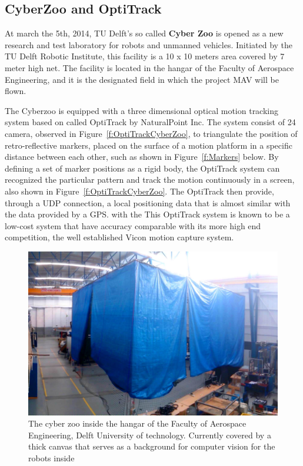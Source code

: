 \subsection{CyberZoo and OptiTrack}
At march the 5th, 2014, TU Delft's so called \textbf{Cyber Zoo} is opened as a new research and test laboratory for robots and unmanned vehicles. Initiated by the TU Delft Robotic Institute, this facility is a 10 x 10 meters area covered by 7 meter high net. The facility is located in the hangar of the Faculty of Aerospace Engineering, and it is the designated field in which the project MAV will be flown.

The Cyberzoo is equipped with a three dimensional optical motion tracking system based on called OptiTrack by NaturalPoint Inc\cite{Hansen:14}\cite{Guadarrama-Olvera:14}. The system consist of 24 camera, observed in Figure~\ref{f:OptiTrackCyberZoo},  to triangulate the position of retro-reflective markers, placed on the surface of a motion platform in a specific distance between each other, such as shown in Figure~\ref{f:Markers} below. By defining a set of marker positions as a rigid body, the OptiTrack system can recognized the particular pattern and track the motion continuously in a screen, also shown in Figure~\ref{f:OptiTrackCyberZoo}. The OptiTrack then provide, through a UDP connection, a local positioning data that is almost similar with the data provided by a GPS. with the This OptiTrack system is known to be a low-cost system that have accuracy comparable with its more high end competition, the well established Vicon motion capture system\cite{Hansen:14}.

\begin{figure}[h]
\includegraphics[width=0.9\linewidth]{Figures/TheCyberZoo.png}
\centering
\caption{The cyber zoo inside the hangar of the Faculty of Aerospace Engineering, Delft University of technology. Currently covered by a thick canvas that serves as a background for computer vision for the robots inside}
\label{f:TheCyberZoo}
\end{figure}

